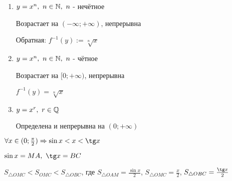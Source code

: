\begin{enumerate}
	\item $y = x^n,\ n \in \mathbb{N},\ n$ - нечётное
	
	Возрастает на $(-\infty; +\infty)$, непрерывна
	
	Обратная: $f^{-1}(y) := \sqrt[n]{x}$
	
	\item $y = x^n,\ n \in \mathbb{N},\ n$ - чётное
	
	Возрастает на $[0; +\infty)$, непрерывна
	
	$f^{-1}(y) = \sqrt[n]{x}$
	
	\item $y = x^r,\ r \in \mathbb{Q}$
	
	Определена и непрерывна на $(0; +\infty)$
\end{enumerate}

\begin{lemma}
	$\forall x \in (0; \frac{\pi}{2}) \Ra \sin x < x < \tg x$
	
	$\sin x = MA,\ \tg x = BC$
	
	$S_{\triangle OMC} < S_{OMC} < S_{\triangle OBC}$, где $S_{\triangle OAM} = \frac{\sin x}{2}$, $S_{\triangle OMC} = \frac{x}{2}$, $S_{\triangle OBC} = \frac{\tg x}{2}$
\end{lemma}